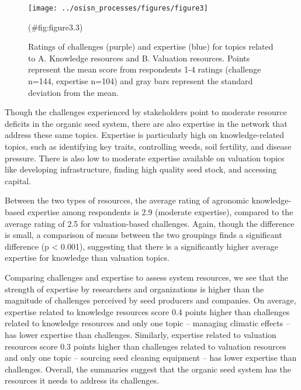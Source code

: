 \documentclass[twoside,12pt,final]{ucthesis-CA2012}
\begin{document}
\begin{ucmainmatter}
\begin{figure}
{\centering \texttt{[image: ../osisn\_processes/figures/figure3]} 

}

\caption{Ratings of challenges (purple) and expertise (blue) for topics related to A. Knowledge resources and B. Valuation resources. Points represent the mean score from respondents 1-4 ratings (challenge n=144, expertise n=104) and gray bars represent the standard deviation from the mean.}(\#fig:figure3.3)
\end{figure}
Though the challenges experienced by stakeholders point to moderate
resource deficits in the organic seed system, there are also expertise
in the network that address these same topics. Expertise is particularly
high on knowledge-related topics, such as identifying key traits,
controlling weeds, soil fertility, and disease pressure. There is also
low to moderate expertise available on valuation topics like developing
infrastructure, finding high quality seed stock, and accessing capital.

Between the two types of resources, the average rating of agronomic
knowledge-based expertise among respondents is 2.9 (moderate expertise),
compared to the average rating of 2.5 for valuation-based challenges.
Again, though the difference is small, a comparison of means between the
two groupings finds a significant difference (p \textless{} 0.001), suggesting
that there is a significantly higher average expertise for knowledge
than valuation topics.

Comparing challenges and expertise to assess system resources, we see
that the strength of expertise by researchers and organizations is
higher than the magnitude of challenges perceived by seed producers and
companies. On average, expertise related to knowledge resources score
0.4 points higher than challenges related to knowledge resources and
only one topic -- managing climatic effects -- has lower expertise than
challenges. Similarly, expertise related to valuation resources score
0.3 points higher than challenges related to valuation resources and
only one topic -- sourcing seed cleaning equipment -- has lower
expertise than challenges. Overall, the summaries suggest that the
organic seed system has the resources it needs to address its
challenges.


\end{ucmainmatter}
\end{document}
